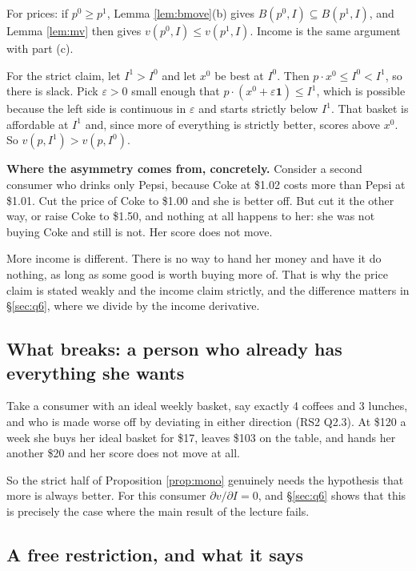 \documentclass[11pt,letterpaper]{article}
\theoremstyle{definition}
\theoremstyle{plain}
\newcommand{\src}[1]{{\small\textsf{(#1)}}}
\newcommand{\skipnote}{\noindent{\small\textsf{Proof. Skippable on a first read.}}\par\smallskip}
\begin{document}
\skipnote
\begin{leftbar}
\small
For prices: if $p^0 \ge p^1$, Lemma \ref{lem:bmove}(b) gives
$B(p^0,I) \subseteq B(p^1,I)$, and Lemma \ref{lem:mv} then gives $v(p^0,I) \le v(p^1,I)$. Income is
the same argument with part (c).

For the strict claim, let $I^1 > I^0$ and let $x^0$ be best at $I^0$. Then $p \cdot x^0 \le I^0 <
I^1$, so there is slack. Pick $\varepsilon > 0$ small enough that
$p \cdot (x^0 + \varepsilon \mathbf{1}) \le I^1$, which is possible because the left side is
continuous in $\varepsilon$ and starts strictly below $I^1$. That basket is affordable at $I^1$ and,
since more of everything is strictly better, scores above $x^0$. So $v(p,I^1) > v(p,I^0)$.
\end{leftbar}

\textbf{Where the asymmetry comes from, concretely.} Consider a second consumer who drinks only
Pepsi, because Coke at \$1.02 costs more than Pepsi at \$1.01. Cut the price of Coke to \$1.00 and
she is better off. But cut it the other way, or raise Coke to \$1.50, and nothing at all happens to
her: she was not buying Coke and still is not. Her score does not move.

More income is different. There is no way to hand her money and have it do nothing, as long as some
good is worth buying more of. That is why the price claim is stated weakly and the income claim
strictly, and the difference matters in \S\ref{sec:q6}, where we divide by the income derivative.

\subsection{What breaks: a person who already has everything she wants}

Take a consumer with an ideal weekly basket, say exactly 4 coffees and 3 lunches, and who is made
worse off by deviating in either direction \src{RS2 Q2.3}. At \$120 a week she buys her ideal basket
for \$17, leaves \$103 on the table, and hands her another \$20 and her score does not move at all.

So the strict half of Proposition \ref{prop:mono} genuinely needs the hypothesis that more is always
better. For this consumer $\partial v / \partial I = 0$, and \S\ref{sec:q6} shows that this is
precisely the case where the main result of the lecture fails.

\subsection{A free restriction, and what it says}
\end{document}
